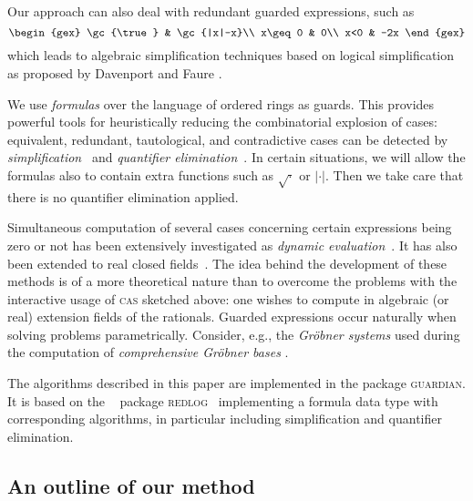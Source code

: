 Our approach can also deal with redundant guarded expressions, such as
\[
\begin{gex}
\gc{\true} & \gc{|x|-x}\\
x\geq0 & 0\\
x<0 & -2x
\end{gex}
\]
which leads to algebraic simplification techniques based on logical
simplification as proposed by Davenport and
Faure \cite{DavenportFaure:94}.

We use {\em formulas} over the language of ordered rings as guards.
This provides powerful tools for heuristically reducing the
combinatorial explosion of cases: equivalent, redundant, tautological,
and contradictive cases can be detected by {\em
simplification}~\cite{Dolzmann:97b} and {\em quantifier
elimination}~\cite{Tarski:48,Collins:75,Weispfenning:88,LoosWeispfenning:93,Weispfenning:96,Weispfenning:94}.
In certain situations, we will allow the formulas also to contain
extra functions such as $\sqrt{\cdot}$ or $|\cdot|$. Then we take care
that there is no quantifier elimination applied.

Simultaneous computation of several cases concerning certain
expressions being zero or not has been extensively investigated as
{\em dynamic
evaluation}~\cite{GomezDiaz:93,DuvalReynaud:94,DuvalReynaud:94a,
BroadberryGomezDiazWatt:95}. It has also been extended to real closed
fields~\cite{DuvalGonzalesVega:93}. The idea behind the development of
these methods is of a more theoretical nature than to overcome the
problems with the interactive usage of \textsc{cas} sketched above: one
wishes to compute in algebraic (or real) extension fields of the
rationals. Guarded expressions occur naturally when solving problems
parametrically. Consider, e.g., the {\em Gr\"obner systems} used
during the computation of {\em comprehensive Gr\"obner bases}
\cite{Weispfenning:92}.

The algorithms described in this paper are implemented in the
\REDUCE package \textsc{guardian}. It is based on the
\REDUCE~\cite{Hearn:91,Melenk:95} package
\textsc{redlog}~\cite{DolzmannSturm:97a,Dolzmann:96a} implementing a
formula data type with corresponding algorithms, in particular
including simplification and quantifier elimination.

\subsection{An outline of our method}
